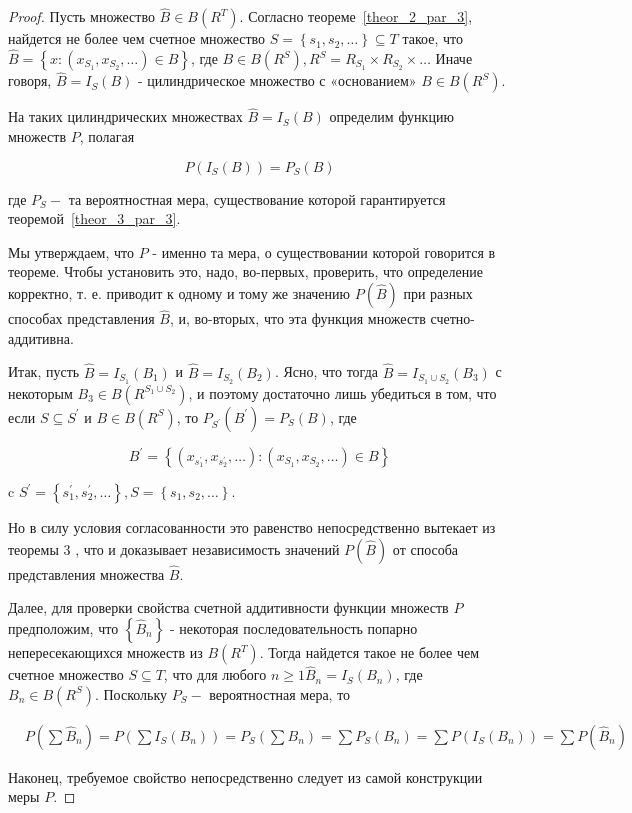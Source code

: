 \begin{proof} Пусть множество $\widehat{B} \in {B}\left(R^{T}\right)$. Согласно теореме~\ref{theor_2_par_3}, найдется не более чем счетное множество $S=\left\{s_{1}, s_{2}, \ldots\right\} \subseteq T$ такое, что $\widehat{B}=\left\{x:\left(x_{S_{1}}, x_{S_{2}}, \ldots\right) \in B\right\}$, где $B \in {B}\left(R^{S}\right), R^{S}=R_{S_{1}} \times R_{S_{2}} \times \ldots$ Иначе говоря, $\widehat{B}={I}_{S}(B)$ - цилиндрическое множество с «основанием» $B \in {B}\left(R^{S}\right)$.

На таких цилиндрических множествах $\widehat{B}={I}_{S}(B)$ определим функцию множеств ${P}$, полагая

$$
{P}\left({I}_{S}(B)\right)=P_{S}(B)
$$

где $P_{S}-$ та вероятностная мера, существование которой гарантируется теоремой~\ref{theor_3_par_3}.

Мы утверждаем, что $P$ - именно та мера, о существовании которой говорится в теореме. Чтобы установить это, надо, во-первых, проверить, что определение корректно, т. е. приводит к одному и тому же значению ${P}(\widehat{B})$ при разных способах представления $\widehat{B}$, и, во-вторых, что эта функция множеств счетно-аддитивна.

Итак, пусть $\widehat{B}={I}_{S_{1}}\left(B_{1}\right)$ и $\widehat{B}={I}_{S_{2}}\left(B_{2}\right)$. Ясно, что тогда $\widehat{B}={I}_{S_{1} \cup S_{2}}\left(B_{3}\right)$ с некоторым $B_{3} \in {B}\left(R^{S_{1} \cup S_{2}}\right)$, и поэтому достаточно лишь убедиться в том, что если $S \subseteq S^{\prime}$ и $B \in {B}\left(R^{S}\right)$, то $P_{S^{\prime}}\left(B^{\prime}\right)=P_{S}(B)$, где

$$
B^{\prime}=\left\{\left(x_{s_{1}^{\prime}}, x_{s_{2}^{\prime}}, \ldots\right):\left(x_{S_{1}}, x_{S_{2}}, \ldots\right) \in B\right\}
$$

c $S^{\prime}=\left\{s_{1}^{\prime}, s_{2}^{\prime}, \ldots\right\}, S=\left\{s_{1}, s_{2}, \ldots\right\}$.

Но в силу условия согласованности это равенство непосредственно вытекает из теоремы 3 , что и доказывает независимость значений ${P}(\widehat{B})$ от способа представления множества $\widehat{B}$.

Далее, для проверки свойства счетной аддитивности функции множеств ${P}$ предположим, что $\left\{\widehat{B}_{n}\right\}$ - некоторая последовательность попарно непересекающихся множеств из ${B}\left(R^{T}\right)$. Тогда найдется такое не более чем счетное множество $S \subseteq T$, что для любого $n \geqslant 1 \widehat{B}_{n}={I}_{S}\left(B_{n}\right)$, где $B_{n} \in {B}\left(R^{S}\right)$. Поскольку $P_{S}-$ вероятностная мера, то

$$
\begin{aligned}
& {P}\left(\sum \widehat{B}_{n}\right)={P}\left(\sum {I}_{S}\left(B_{n}\right)\right)=P_{S}\left(\sum B_{n}\right)=\sum P_{S}(B_n) = \sum{P}\left( {I}_{S}\left(B_{n}\right)\right) = \sum{P}\left(\widehat{B}_{n}\right)
\end{aligned}
$$


Наконец, требуемое свойство непосредственно следует из самой конструкции меры ${P}$.
\end{proof}


